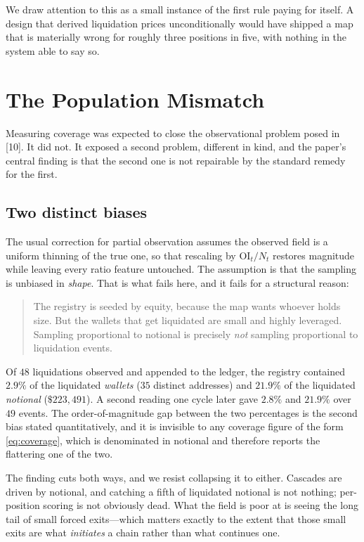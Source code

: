 \documentclass[11pt,a4paper]{article}
\theoremstyle{definition}
\theoremstyle{plain}
\begin{document}
We draw attention to this as a small instance of the first rule paying for itself. A design that
derived liquidation prices unconditionally would have shipped a map that is materially wrong for
roughly three positions in five, with nothing in the system able to say so.

\section{The Population Mismatch}
\label{sec:mismatch}

Measuring coverage was expected to close the observational problem posed in [10]. It did
not. It exposed a second problem, different in kind, and the paper's central finding is that the
second one is not repairable by the standard remedy for the first.

\subsection{Two distinct biases}

The usual correction for partial observation assumes the observed field is a uniform thinning of the
true one, so that rescaling by $\mathrm{OI}_t / N_t$ restores magnitude while leaving every ratio
feature untouched. The assumption is that the sampling is unbiased in \emph{shape}. That is what
fails here, and it fails for a structural reason:

\begin{quote}
The registry is seeded by equity, because the map wants whoever holds size. But the wallets that get
liquidated are small and highly leveraged. Sampling proportional to notional is precisely \emph{not}
sampling proportional to liquidation events.
\end{quote}

Of $48$ liquidations observed and appended to the ledger, the registry contained $2.9\%$ of the
liquidated \emph{wallets} ($35$ distinct addresses) and $21.9\%$ of the liquidated \emph{notional}
($\$223{,}491$). A second reading one cycle later gave $2.8\%$ and $21.9\%$ over $49$ events. The
order-of-magnitude gap between the two percentages is the second bias stated quantitatively, and it
is invisible to any coverage figure of the form \eqref{eq:coverage}, which is denominated in notional
and therefore reports the flattering one of the two.

The finding cuts both ways, and we resist collapsing it to either. Cascades are driven by notional,
and catching a fifth of liquidated notional is not nothing; per-position scoring is not obviously
dead. What the field is poor at is seeing the long tail of small forced exits---which matters exactly
to the extent that those small exits are what \emph{initiates} a chain rather than what continues one.
\end{document}
